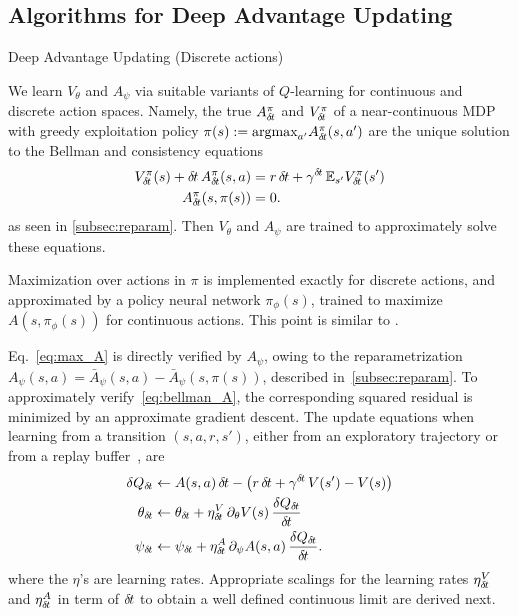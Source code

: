 \subsection{Algorithms for Deep Advantage Updating}
\label{subsec:algorithm}
\begin{algorithm}[ht]
  \caption{Deep Advantage Updating (Discrete actions)}
  \label{alg:dau}
	
\end{algorithm}

We learn $V_{\theta}$ and $A_{\psi}$ via suitable variants of $Q$-learning for continuous and
discrete action spaces. Namely, 
the true $A^\pi_{\delta\hspace{-.1em}t}$
and $V^\pi_{\delta\hspace{-.1em}t}$ of a near-continuous MDP with greedy exploitation
policy $\pi(s) \mathrel{\mathop{:}}=
\text{argmax}_{a'}A^\pi_{\delta\hspace{-.1em}t}(s, a')$
are the unique solution to the Bellman and consistency equations
\begin{align}
	V^{\pi}_{\delta\hspace{-.1em}t}(s) + {\delta\hspace{-.1em}t}\, A^{\pi}_{\delta\hspace{-.1em}t}(s, a) &=
	r\,{\delta\hspace{-.1em}t} + \gamma^{{\delta\hspace{-.1em}t}}  \,\mathbb{E}_{s'} V^{\pi}_{\delta\hspace{-.1em}t}(s')\label{eq:bellman_A}\\
	A^{\pi}_{\delta\hspace{-.1em}t}(s, \pi(s)) &= 0\label{eq:max_A}.
\end{align}
as seen in \ref{subsec:reparam}. Then $V_{\theta}$
and $A_{\psi}$ are trained to approximately solve these equations.

Maximization over actions in $\pi$ is implemented exactly for discrete actions,
and approximated by a policy neural network $\pi_\phi(s)$, trained to maximize $A(s,
\pi_\phi(s))$ for continuous actions. This point is similar to
\cite{ddpg}.

Eq.~\eqref{eq:max_A}
is directly verified by $A_{\psi}$, owing to the reparametrization
$A_\psi(s, a) = \bar{A}_\psi(s, a) - \bar{A}_\psi(s, \pi(s))$, described
in~\ref{subsec:reparam}.  To approximately verify~\eqref{eq:bellman_A}, the
corresponding squared residual is minimized by an approximate gradient descent.
The update equations when learning from a transition $(s, a, r, s')$, either from
an exploratory trajectory or from a replay buffer~\cite{dqn}, are
\begin{align}
	\delta Q_{\delta\hspace{-.1em}t} &\leftarrow A(s, a)\, {\delta\hspace{-.1em}t} - \left(r
	\,{\delta\hspace{-.1em}t} + \gamma^{{\delta\hspace{-.1em}t}}\, V(s') - V(s)\right)\\
	\theta_{\delta\hspace{-.1em}t} &\leftarrow \theta_{\delta\hspace{-.1em}t} + \eta^V_{\delta\hspace{-.1em}t}
	\,\partial_{\theta} V(s) \,\frac{\delta Q_{\delta\hspace{-.1em}t}}{{\delta\hspace{-.1em}t}}\\
	\psi_{\delta\hspace{-.1em}t} &\leftarrow \psi_{\delta\hspace{-.1em}t} + \eta^A_{\delta\hspace{-.1em}t}
	\,\partial_{\psi} A(s, a) \,\frac{\delta Q_{\delta\hspace{-.1em}t}}{{\delta\hspace{-.1em}t}}.
	\label{eq:approx_bellman_A}
\end{align} 
where the $\eta$'s are learning rates.
Appropriate scalings for the learning rates $\eta^V_{\delta\hspace{-.1em}t}$ and
$\eta^A_{\delta\hspace{-.1em}t}$ in term of ${\delta\hspace{-.1em}t}$ to obtain a well defined continuous
limit are derived next.


